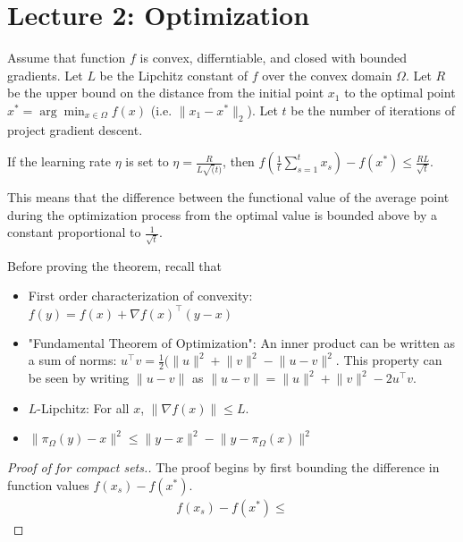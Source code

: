 \section{Lecture 2: Optimization}


\begin{theorem}
Assume that function $f$ is convex, differntiable, and closed with bounded gradients. Let $L$ be the Lipchitz constant of $f$ over the convex domain $\Omega$. Let $R$ be the upper bound on the distance from the initial point $x_1$ to the optimal point $x^* = \arg\min_{x \in \Omega} f(x)$ (i.e. $\lVert x_1 - x^* \rVert_2$). Let $t$ be the number of iterations of project gradient descent.

If the learning rate $\eta$ is set to $\eta=\frac{R}{L \sqrt(t)}$, then $f\left(\frac{1}{t}\sum_{s=1}^t x_s\right) - f\left(x^*\right) \leq \frac{RL}{\sqrt{t}}$.

This means that the difference between the functional value of the average point during the optimization process from the optimal value is bounded above by a constant proportional to $\frac{1}{\sqrt{t}}$. 

\end{theorem}

Before proving the theorem, recall that
\begin{itemize}
    \item First order characterization of convexity: $f(y) = f(x) + \nabla f(x)^\top (y - x)$
    \item "Fundamental Theorem of Optimization": An inner product can be written as a sum of norms: $u^\top v = \frac{1}{2}(\lVert u \rVert^2 + \lVert v \lVert^2 - \lVert u - v \rVert^2$. This property can be seen by writing $\lVert u - v \rVert$ as $\lVert u - v \rVert = \lVert u \rVert^2 + \lVert v \lVert^2 - 2 u^\top v$.
    \item $L$-Lipchitz: For all $x$, $\lVert \nabla f(x) \rVert \leq L$.
    \item $\lVert \pi_\Omega (y) - x \rVert^2 \leq \lVert y - x \rVert^2 - \lVert y - \pi_\Omega (x) \rVert^2$ %
\end{itemize}


\begin{proof}[Proof of  for compact sets.]
The proof begins by first bounding the difference in function values $f(x_s) - f(x^*)$.
\begin{align}
    f(x_s) - f(x^*) \leq 
\end{align}
\end{proof}